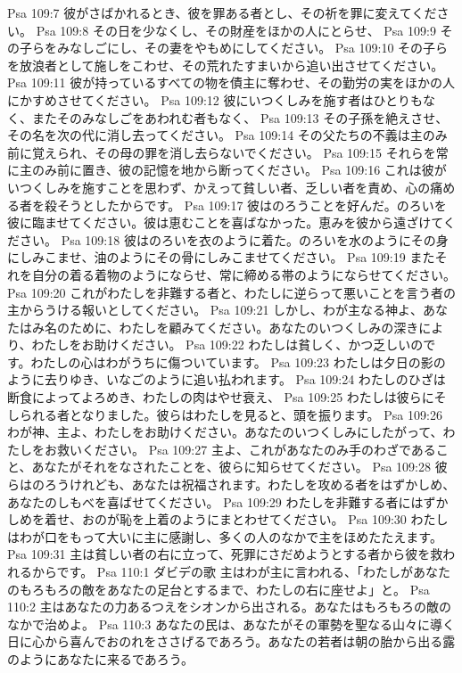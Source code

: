 Psa 109:7  彼がさばかれるとき、彼を罪ある者とし、その祈を罪に変えてください。
Psa 109:8  その日を少なくし、その財産をほかの人にとらせ、
Psa 109:9  その子らをみなしごにし、その妻をやもめにしてください。
Psa 109:10  その子らを放浪者として施しをこわせ、その荒れたすまいから追い出させてください。
Psa 109:11  彼が持っているすべての物を債主に奪わせ、その勤労の実をほかの人にかすめさせてください。
Psa 109:12  彼にいつくしみを施す者はひとりもなく、またそのみなしごをあわれむ者もなく、
Psa 109:13  その子孫を絶えさせ、その名を次の代に消し去ってください。
Psa 109:14  その父たちの不義は主のみ前に覚えられ、その母の罪を消し去らないでください。
Psa 109:15  それらを常に主のみ前に置き、彼の記憶を地から断ってください。
Psa 109:16  これは彼がいつくしみを施すことを思わず、かえって貧しい者、乏しい者を責め、心の痛める者を殺そうとしたからです。
Psa 109:17  彼はのろうことを好んだ。のろいを彼に臨ませてください。彼は恵むことを喜ばなかった。恵みを彼から遠ざけてください。
Psa 109:18  彼はのろいを衣のように着た。のろいを水のようにその身にしみこませ、油のようにその骨にしみこませてください。
Psa 109:19  またそれを自分の着る着物のようにならせ、常に締める帯のようにならせてください。
Psa 109:20  これがわたしを非難する者と、わたしに逆らって悪いことを言う者の主からうける報いとしてください。
Psa 109:21  しかし、わが主なる神よ、あなたはみ名のために、わたしを顧みてください。あなたのいつくしみの深きにより、わたしをお助けください。
Psa 109:22  わたしは貧しく、かつ乏しいのです。わたしの心はわがうちに傷ついています。
Psa 109:23  わたしは夕日の影のように去りゆき、いなごのように追い払われます。
Psa 109:24  わたしのひざは断食によってよろめき、わたしの肉はやせ衰え、
Psa 109:25  わたしは彼らにそしられる者となりました。彼らはわたしを見ると、頭を振ります。
Psa 109:26  わが神、主よ、わたしをお助けください。あなたのいつくしみにしたがって、わたしをお救いください。
Psa 109:27  主よ、これがあなたのみ手のわざであること、あなたがそれをなされたことを、彼らに知らせてください。
Psa 109:28  彼らはのろうけれども、あなたは祝福されます。わたしを攻める者をはずかしめ、あなたのしもべを喜ばせてください。
Psa 109:29  わたしを非難する者にはずかしめを着せ、おのが恥を上着のようにまとわせてください。
Psa 109:30  わたしはわが口をもって大いに主に感謝し、多くの人のなかで主をほめたたえます。
Psa 109:31  主は貧しい者の右に立って、死罪にさだめようとする者から彼を救われるからです。
Psa 110:1  ダビデの歌 主はわが主に言われる、「わたしがあなたのもろもろの敵をあなたの足台とするまで、わたしの右に座せよ」と。
Psa 110:2  主はあなたの力あるつえをシオンから出される。あなたはもろもろの敵のなかで治めよ。
Psa 110:3  あなたの民は、あなたがその軍勢を聖なる山々に導く日に心から喜んでおのれをささげるであろう。あなたの若者は朝の胎から出る露のようにあなたに来るであろう。
